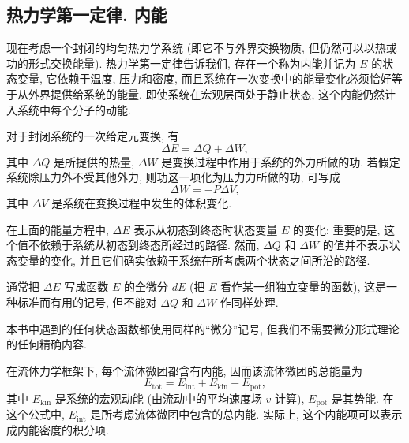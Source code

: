 \subsection{热力学第一定律. 内能}
\label{sec:app-b-first-law-internal-energy}
\renewcommand{\thestatement}{B.2.\arabic{statement}}
\renewcommand{\theHstatement}{appB.sec02.\arabic{statement}}
\setcounter{statement}{0}

现在考虑一个封闭的均匀热力学系统 (即它不与外界交换物质, 但仍然可以以热或功的形式交换能量). 热力学第一定律告诉我们, 存在一个称为内能并记为 $E$ 的状态变量, 它依赖于温度, 压力和密度, 而且系统在一次变换中的能量变化必须恰好等于从外界提供给系统的能量. 即使系统在宏观层面处于静止状态, 这个内能仍然计入系统中每个分子的动能.

对于封闭系统的一次给定元变换, 有
\[
 \Delta E=\Delta Q+\Delta W,
\]
其中 $\Delta Q$ 是所提供的热量, $\Delta W$ 是变换过程中作用于系统的外力所做的功. 若假定系统除压力外不受其他外力, 则功这一项化为压力力所做的功, 可写成
\[
 \Delta W=-P\Delta V,
\]
其中 $\Delta V$ 是系统在变换过程中发生的体积变化.

\begin{Remark}
\label{rem:app-b-exact-differential}
在上面的能量方程中, $\Delta E$ 表示从初态到终态时状态变量 $E$ 的变化; 重要的是, 这个值不依赖于系统从初态到终态所经过的路径. 然而, $\Delta Q$ 和 $\Delta W$ 的值并不表示状态变量的变化, 并且它们确实依赖于系统在所考虑两个状态之间所沿的路径.

通常把 $\Delta E$ 写成函数 $E$ 的全微分 $dE$ (把 $E$ 看作某一组独立变量的函数), 这是一种标准而有用的记号, 但不能对 $\Delta Q$ 和 $\Delta W$ 作同样处理.

本书中遇到的任何状态函数都使用同样的``微分''记号, 但我们不需要微分形式理论的任何精确内容.
\end{Remark}

\begin{Remark}
\label{rem:app-b-fluid-element-total-energy}
在流体力学框架下, 每个流体微团都含有内能, 因而该流体微团的总能量为
\[
 E_{\mathrm{tot}}=E_{\mathrm{int}}+E_{\mathrm{kin}}+E_{\mathrm{pot}},
\]
其中 $E_{\mathrm{kin}}$ 是系统的宏观动能 (由流动中的平均速度场 $v$ 计算), $E_{\mathrm{pot}}$ 是其势能. 在这个公式中, $E_{\mathrm{int}}$ 是所考虑流体微团中包含的总内能. 实际上, 这个内能项可以表示成内能密度的积分项.
\end{Remark}
